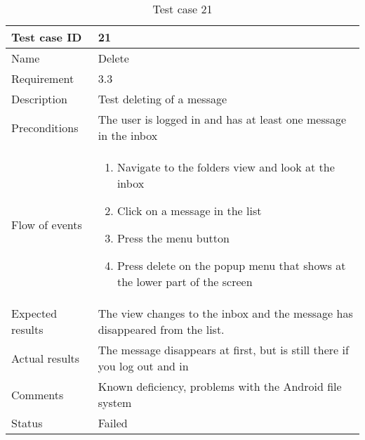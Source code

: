 		\begin{table}
			\begin{tabular}{l|p{10cm}}
				Test case ID & 21 \\ \hline
				Name & Delete\\ \hline
				Requirement & 3.3\\ \hline
				Description & Test deleting of a message\\ \hline
				Preconditions & The user is logged in and has at least one message in the inbox\\ \hline
				Flow of events & 
					\begin{enumerate}
						\item{}Navigate to the folders view and look at the inbox
						\item{}Click on a message in the list
						\item{}Press the menu button
						\item{}Press delete on the popup menu that shows at the lower part of the screen
					\end{enumerate} \\ \hline
				Expected results & The view changes to the inbox and the message has disappeared from the list. \\ \hline
				Actual results &The message disappears at first, but is still there if you log out and in\\ \hline
				Comments &Known deficiency, problems with the Android file system\\ \hline
				Status &Failed \\ \hline
			\end{tabular}
			\caption{Test case 21} \label{tab:case21}
		\end{table}

